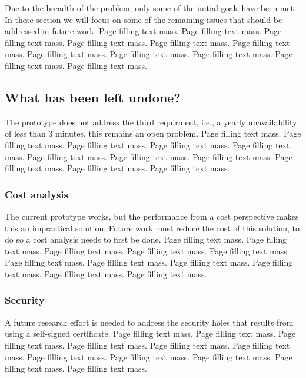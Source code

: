 \documentclass[12pt,a4paper,twoside,openright]{book}
\begin{document}
Due to the breadth of the problem, only some of the initial goals have been
met. In these section we will focus on some of the remaining issues that
should be addressed in future work. Page filling text mass. Page filling text
mass. Page filling text mass. Page filling text mass. Page filling text
mass. Page filling text mass. Page filling text mass. Page filling text
mass. Page filling text mass. Page filling text mass. Page filling text mass.

\subsection{What has been left undone?}
\label{what-has-been-left-undone}

The prototype does not address the third requirment, i.e., a yearly
unavailability of less than 3 minutes, this remains an open problem.  Page
filling text mass. Page filling text mass. Page filling text mass. Page
filling text mass. Page filling text mass. Page filling text mass. Page
filling text mass. Page filling text mass. Page filling text mass. Page
filling text mass. Page filling text mass.

\subsubsection{Cost analysis}

The current prototype works, but the performance from a cost perspective makes
this an impractical solution. Future work must reduce the cost of this
solution, to do so a cost analysis needs to first be done. Page filling text
mass. Page filling text mass. Page filling text mass. Page filling text
mass. Page filling text mass. Page filling text mass. Page filling text
mass. Page filling text mass. Page filling text mass. Page filling text
mass. Page filling text mass.

\subsubsection{Security}

A future research effort is needed to address the security holes that results
from using a self-signed certificate. Page filling text mass. Page filling
text mass. Page filling text mass. Page filling text mass. Page filling text
mass. Page filling text mass. Page filling text mass. Page filling text
mass. Page filling text mass. Page filling text mass. Page filling text mass.
\end{document}
